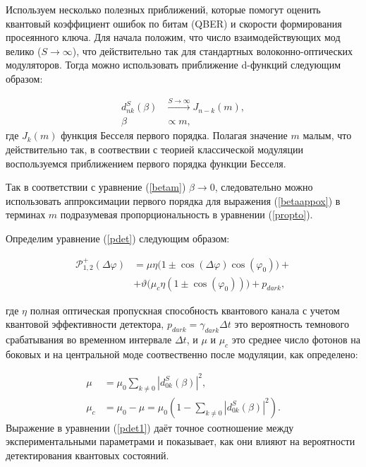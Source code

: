Используем несколько полезных приближений, которые помогут оценить квантовый коэффициент ошибок по битам (QBER) и скорости формирования просеянного ключа. Для начала положим, что число взаимодействующих мод велико ($S\rightarrow \infty$), что действительно так для стандартных волоконно-оптических модуляторов. Тогда можно использовать приближение d-функций следующим образом:

\begin{align}
d_{nk}^S(\beta) &\xrightarrow{S\rightarrow \infty} J_{n-k}(m), \label{limdj} \\
\beta &\propto m, \label{propto}
\end{align}
где $J_k(m)$ функция Бесселя первого порядка. Полагая значение $m$ малым, что действительно так, в соотвествии с теорией классической модуляции воспользуемся приближением первого порядка функции Бесселя. 


Так в соответствии с уравнение (\ref{betam}) $\beta \rightarrow 0$, следовательно можно использовать аппроксимации первого порядка для выражения (\ref{betaappox}) в терминах $m$ подразумевая пропорциональность в уравнении (\ref{propto}).


Определим уравнение (\ref{pdet}) следующим образом:

\begin{align}\label{pdet1}
 \mathcal{P}_{1,2}^{+}(\Delta\varphi)&=\mu\eta\Big(1\pm\cos(\Delta\varphi)\cos(\varphi_0)\Big)+ \nonumber
 \\
 &+\vartheta\Big(\mu_c\eta(1\pm\cos(\varphi_0))\Big)+p_{dark},
\end{align}


где $\eta$ полная оптическая пропускная способность квантового канала с учетом квантовой эффективности детектора, $p_{dark}=\gamma_{dark}\Delta t$ это вероятность темнового срабатывания во временном интервале $\Delta t$, и $\mu$ и $\mu_c$ это среднее число фотонов на боковых и на центральной моде соотвественно после модуляции, как определено:

\begin{align}
    \mu&=\mu_0\sum_{k\neq 0}|d_{0k}^{S}(\beta)|^2, \\
    \mu_c&=\mu_0-\mu=\mu_0(1-\sum_{k\neq 0}|d_{0k}^{S}(\beta)|^2).
\end{align}
Выражение в уравнении (\ref{pdet1}) даёт точное соотношение между экспериментальными параметрами и показывает, как они влияют на вероятности детектирования квантовых состояний. 


\pagebreak

